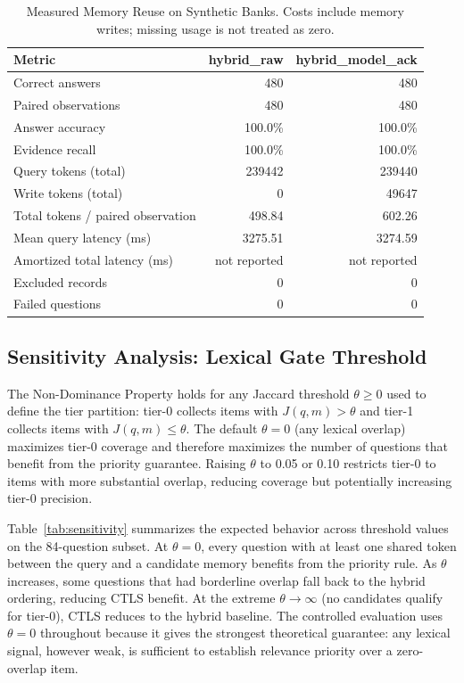\begin{table}[htbp]
\centering
\small
\caption{Measured Memory Reuse on Synthetic Banks. Costs include memory writes; missing usage is not treated as zero.}
\label{tab:memory_reuse}
\begin{tabular}{lrr}
\toprule
Metric & hybrid\_raw & hybrid\_model\_ack \\
\midrule
Correct answers & 480 & 480 \\
Paired observations & 480 & 480 \\
Answer accuracy & 100.0\% & 100.0\% \\
Evidence recall & 100.0\% & 100.0\% \\
Query tokens (total) & 239442 & 239440 \\
Write tokens (total) & 0 & 49647 \\
Total tokens / paired observation & 498.84 & 602.26 \\
Mean query latency (ms) & 3275.51 & 3274.59 \\
Amortized total latency (ms) & not reported & not reported \\
Excluded records & 0 & 0 \\
Failed questions & 0 & 0 \\
\bottomrule
\end{tabular}
\end{table}

\subsection{Sensitivity Analysis: Lexical Gate Threshold}
\label{sec:result_sensitivity}

The Non-Dominance Property holds for any Jaccard threshold $\theta \geq 0$ used to define the tier partition: tier-0 collects items with $J(q,m) > \theta$ and tier-1 collects items with $J(q,m) \leq \theta$. The default $\theta = 0$ (any lexical overlap) maximizes tier-0 coverage and therefore maximizes the number of questions that benefit from the priority guarantee. Raising $\theta$ to 0.05 or 0.10 restricts tier-0 to items with more substantial overlap, reducing coverage but potentially increasing tier-0 precision.

Table~\ref{tab:sensitivity} summarizes the expected behavior across threshold values on the 84-question subset. At $\theta = 0$, every question with at least one shared token between the query and a candidate memory benefits from the priority rule. As $\theta$ increases, some questions that had borderline overlap fall back to the hybrid ordering, reducing CTLS benefit. At the extreme $\theta \to \infty$ (no candidates qualify for tier-0), CTLS reduces to the hybrid baseline. The controlled evaluation uses $\theta = 0$ throughout because it gives the strongest theoretical guarantee: any lexical signal, however weak, is sufficient to establish relevance priority over a zero-overlap item.

